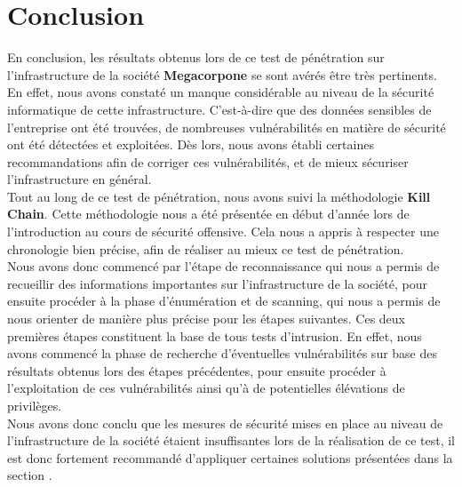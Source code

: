 \documentclass[a4paper]{article}
\begin{document}
\newpage
\section{Conclusion}
En conclusion, les résultats obtenus lors de ce test de pénétration sur l'infrastructure de la société \textbf{Megacorpone} se sont avérés être très pertinents. En effet, nous avons constaté un manque considérable au niveau de la sécurité informatique de cette infrastructure. C'est-à-dire que des données sensibles de l'entreprise ont été trouvées, de nombreuses vulnérabilités en matière de sécurité ont été détectées et exploitées. Dès lors, nous avons établi certaines recommandations afin de corriger ces vulnérabilités, et de mieux sécuriser l'infrastructure en général.\\

Tout au long de ce test de pénétration, nous avons suivi la méthodologie \textbf{Kill Chain}. Cette méthodologie nous a été présentée en début d'année lors de l'introduction au cours de sécurité offensive. Cela nous a appris à respecter une chronologie bien précise, afin de réaliser au mieux ce test de pénétration.\\

Nous avons donc commencé par l'étape de reconnaissance qui nous a permis de recueillir des informations importantes sur l'infrastructure de la société, pour ensuite procéder à la phase d'énumération et de scanning, qui nous a permis de nous orienter de manière plus précise pour les étapes suivantes. Ces deux premières étapes constituent la base de tous tests d'intrusion. En effet, nous avons commencé la phase de recherche d'éventuelles vulnérabilités sur base des résultats obtenus lors des étapes précédentes, pour ensuite procéder à l'exploitation de ces vulnérabilités ainsi qu'à de potentielles élévations de privilèges.\\

Nous avons donc conclu que les mesures de sécurité mises en place au niveau de l'infrastructure de la société étaient insuffisantes lors de la réalisation de ce test, il est donc fortement recommandé d'appliquer certaines solutions présentées dans la section .
\end{document}
